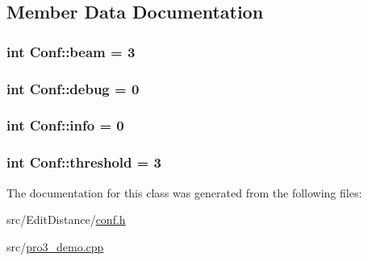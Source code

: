 \subsection{Member Data Documentation}
\hypertarget{class_conf_a4c3c0b9e5ea26314911bf1e645779377}{
\subsubsection[{beam}]{\setlength{\rightskip}{0pt plus 5cm}int Conf\+::beam = 3\hspace{0.3cm}{\ttfamily [static]}}}\label{class_conf_a4c3c0b9e5ea26314911bf1e645779377}
\hypertarget{class_conf_a142f3e8a32431f0c5d2d1ed25a547979}{
\subsubsection[{debug}]{\setlength{\rightskip}{0pt plus 5cm}int Conf\+::debug = 0\hspace{0.3cm}{\ttfamily [static]}}}\label{class_conf_a142f3e8a32431f0c5d2d1ed25a547979}
\hypertarget{class_conf_adba927d772295408e9c93e9b7bf30eb8}{
\subsubsection[{info}]{\setlength{\rightskip}{0pt plus 5cm}int Conf\+::info = 0\hspace{0.3cm}{\ttfamily [static]}}}\label{class_conf_adba927d772295408e9c93e9b7bf30eb8}
\hypertarget{class_conf_a711f62286eebacda65e1ae8da7eaebd2}{
\subsubsection[{threshold}]{\setlength{\rightskip}{0pt plus 5cm}int Conf\+::threshold = 3\hspace{0.3cm}{\ttfamily [static]}}}\label{class_conf_a711f62286eebacda65e1ae8da7eaebd2}


The documentation for this class was generated from the following files\+:\begin{DoxyCompactItemize}
\item 
src/\+Edit\+Distance/\hyperlink{conf_8h}{conf.\+h}\item 
src/\hyperlink{pro3__demo_8cpp}{pro3\+\_\+demo.\+cpp}\end{DoxyCompactItemize}
